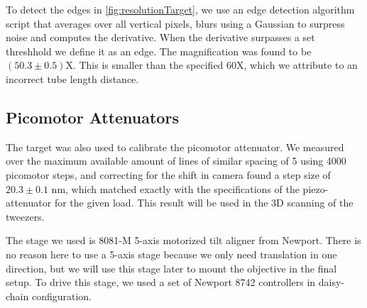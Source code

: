 To detect the edges in \cref{fig:resolutionTarget}, we use an edge detection algorithm script that averages over all vertical pixels, blurs using a Gaussian to surpress noise and computes the derivative. When the derivative surpasses a set threshhold we define it as an edge. The magnification was found to be $(50.3\pm0.5)$X. This is smaller than the specified 60X, which we attribute to an incorrect tube length distance. 

\subsection{Picomotor Attenuators}

The target was also used to calibrate the picomotor attenuator. We measured over the maximum available amount of lines of similar spacing of 5 using 4000 picomotor steps, and correcting for the shift in camera found a step size of $20.3\pm0.1$ nm, which matched exactly with the specifications of the piezo-attenuator for the given load. This result will be used in the 3D scanning of the tweezers. 

The stage we used is 8081-M 5-axis motorized tilt aligner from Newport. There is no reason here to use a 5-axis stage because we only need translation in one direction, but we will use this stage later to mount the objective in the final setup. To drive this stage, we used a set of Newport 8742 controllers in daisy-chain configuration. 



